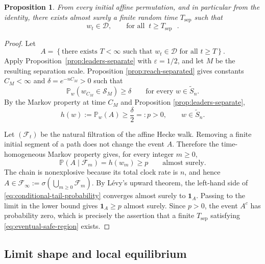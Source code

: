 \documentclass[11pt,a4paper]{amsart}
\newtheorem{proposition}[theorem]{Proposition}
\theoremstyle{definition}
\theoremstyle{remark}
\numberwithin{equation}{section}
\newcommand{\Pp}{\mathbb P}
\newcommand{\one}{\mathbf 1}
\newcommand{\wtS}{\widetilde S_n}
\newcommand{\cD}{\mathcal D}
\newcommand{\cS}{\mathcal S}
\newcommand{\cF}{\mathcal F}
\begin{document}
	\begin{proposition}\label{prop:eventual-separation}
		From every initial affine permutation, and in particular from the identity,
		there exists almost surely a finite random time $T_\mathrm{sep}$ such that
		\begin{equation}\label{eq:eventual-safe-region}
			w_t\in\cD,
			\qquad \mbox{for all $\ t \ge T_\mathrm{sep}$ }.
		\end{equation}
	\end{proposition}
	
	\begin{proof}
		Let
		\[
		A=\left\{\text{there exists }T<\infty\text{ such that }
		w_t\in\cD\text{ for all }t\ge T\right\}.
		\]
		Apply Proposition~\ref{prop:leaders-separate} with $\varepsilon=1/2$, and
		let $M$ be the resulting separation scale.  Proposition
		\ref{prop:reach-separated} gives constants $C_M<\infty$ and
		$\delta=e^{-nC_M}>0$ such that
		\[
		\Pp_w(w_{C_M}\in\cS_M)\ge\delta
		\qquad\text{for every }w\in\wtS.
		\]
		By the Markov property at time $C_M$ and Proposition
		\ref{prop:leaders-separate},
		\begin{equation}\label{eq:uniform-eventual-success}
			h(w):=\Pp_w(A)\ge\frac{\delta}{2}=:p>0,
			\qquad w\in\wtS.
		\end{equation}
		
		Let $(\cF_t)$ be the natural filtration of the affine Hecke walk.  Removing a finite initial segment
		of a path does not change the event $A$.  Therefore the time-homogeneous
		Markov property gives, for every integer $m\ge0$,
		\begin{equation}\label{eq:conditional-tail-probability}
			\Pp(A\mid\cF_m)=h(w_m)\ge p
			\qquad\text{almost surely}.
		\end{equation}
		The chain is nonexplosive because its total clock rate is $n$, and hence
		$A\in\cF_\infty:=\sigma(\bigcup_{m\ge0}\cF_m)$.  By L\'evy's upward theorem,
		the left-hand side of \eqref{eq:conditional-tail-probability} converges
		almost surely to $\one_A$.  Passing to the limit in the lower bound gives
		$\one_A\ge p$ almost surely.  Since $p>0$, the event $A^c$ has probability
		zero, which is precisely the assertion that a finite
		$T_\mathrm{sep}$ satisfying \eqref{eq:eventual-safe-region} exists.
	\end{proof}
	
	\subsection{Limit shape and local equilibrium}\label{subsec:limit-shape}
	
\end{document}
